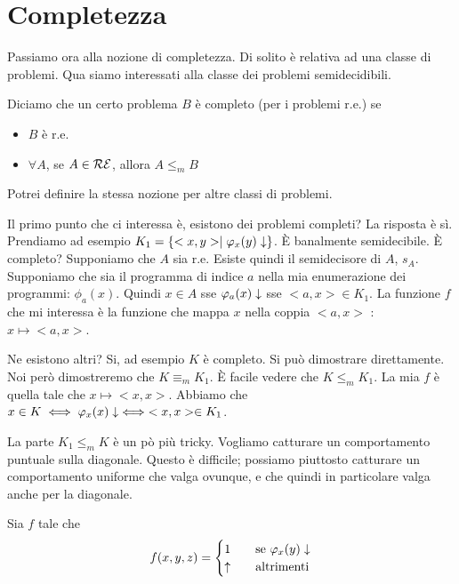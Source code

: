 \section{Completezza}

Passiamo ora alla nozione di completezza. Di solito è relativa ad una classe di problemi. Qua siamo
interessati alla classe dei problemi semidecidibili.
\begin{defn}
    Diciamo che un certo problema $B$ è completo (per i problemi r.e.) se
    \begin{itemize}
        \item $B$ è r.e.
        \item $\forall A$, se $A \in \mathcal{RE}$, allora $A \leq_{m} B$
    \end{itemize}
\end{defn}

Potrei definire la stessa nozione per altre classi di problemi.

Il primo punto che ci interessa è, esistono dei problemi completi? La risposta è sì. Prendiamo ad
esempio $K_{1} = \{<x,y> \mid \varphi_{x}(y) \downarrow\}$. È banalmente semidecibile. È completo? Supponiamo
che $A$ sia r.e. Esiste quindi il semidecisore di $A$, $s_{A}$. Supponiamo che sia il programma di
indice $a$ nella mia enumerazione dei programmi: $\phi_{a}(x)$. Quindi $x \in A$ sse $\varphi_{a}(x) \downarrow$
sse $<a,x> \in K_{1}$. La funzione $f$ che mi interessa è la funzione che mappa $x$ nella coppia
$<a,x>$ : $x \mapsto <a,x>$.

Ne esistono altri? Si, ad esempio $K$ è completo. Si può dimostrare direttamente. Noi però
dimostreremo che $K \equiv_{m} K_{1}$. È facile vedere che $K \leq_{m} K_{1}$. La mia $f$ è quella tale
che $x \mapsto <x,x>$. Abbiamo che $x \in K \iff \varphi_{x}(x)\downarrow \iff <x,x> \in K_{1}$.

La parte $K_{1} \leq_{m} K$ è un pò più tricky. Vogliamo catturare un comportamento puntuale sulla
diagonale. Questo è difficile; possiamo piuttosto catturare un comportamento uniforme che valga
ovunque, e che quindi in particolare valga anche per la diagonale.

Sia $f$ tale che
\begin{equation*}
    f(x,y,z) =
    \begin{cases}
        1 \quad &\text{se $\varphi_{x}(y) \downarrow$} \\
        \uparrow \quad &\text{altrimenti}
    \end{cases}
\end{equation*}


